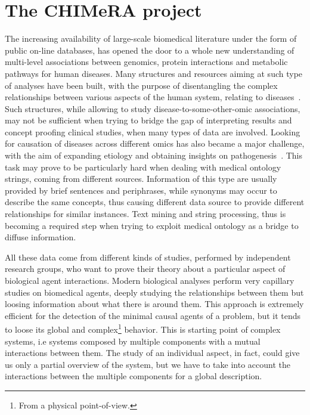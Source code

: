 \documentclass{standalone}
\begin{document}
\section[CHIMeRA]{The CHIMeRA project}\label{chimera:chimera}

The increasing availability of large-scale biomedical literature under the form of public on-line databases, has opened the door to a whole new understanding of multi-level associations between genomics, protein interactions and metabolic pathways for human diseases.
Many structures and resources aiming at such type of analyses have been built, with the purpose of disentangling the complex relationships between various aspects of the human system, relating to diseases~\cite{SymtomsNet, HumanPhenotype, chimerDB2017}.
Such structures, while allowing to study disease-to-some-other-omic associations, may not be sufficient when trying to bridge the gap of interpreting results and concept proofing clinical studies, when many types of data are involved.
Looking for causation of diseases across different omics has also became a major challenge, with the aim of expanding etiology and obtaining insights on pathogenesis~\cite{Barabasi2007}.
This task may prove to be particularly hard when dealing with medical ontology strings, coming from different sources.
Information of this type are usually provided by brief sentences and periphrases, while synonyms may occur to describe the same concepts, thus causing different data source to provide different relationships for similar instances.
Text mining and string processing, thus is becoming a required step when trying to exploit medical ontology as a bridge to diffuse information.

All these data come from different kinds of studies, performed by independent research groups, who want to prove their theory about a particular aspect of biological agent interactions.
Modern biological analyses perform very capillary studies on biomedical agents, deeply studying the relationships between them but loosing information about what there is around them.
This approach is extremely efficient for the detection of the minimal causal agents of a problem, but it tends to loose its global and complex\footnote{
  From a physical point-of-view.
} behavior.
This is starting point of complex systems, i.e systems composed by multiple components with a mutual interactions between them.
The study of an individual aspect, in fact, could give us only a partial overview of the system, but we have to take into account the interactions between the multiple components for a global description.
\end{document}
